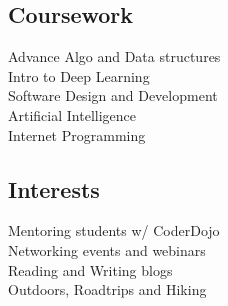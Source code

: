 \documentclass[]{rinkal_resume}
\begin{document}
\begin{minipage}[t]{0.30\textwidth}
\sectionsep

\subsection{Coursework}
Advance Algo and Data structures \\
Intro to Deep Learning \\
Software Design and Development \\
Artificial Intelligence \\
Internet Programming \\
\sectionsep

\subsection{Interests}
\textbullet{} Mentoring students w/ CoderDojo \\
\textbullet{} Networking events and webinars \\
\textbullet{} Reading and Writing blogs \\
\textbullet{} Outdoors, Roadtrips and Hiking \\
%
%

\end{minipage} 
\hfill
\end{document}
